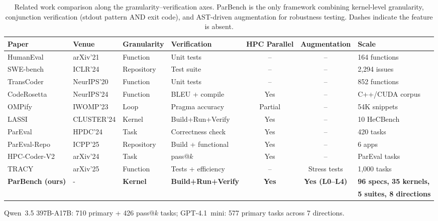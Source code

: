 \documentclass[conference]{IEEEtran}
\begin{document}
\begin{table}[t]
\centering
\caption{Related work comparison along the granularity--verification axes. ParBench is the only framework combining kernel-level granularity, conjunction verification (stdout pattern AND exit code), and AST-driven augmentation for robustness testing. Dashes indicate the feature is absent.}
\label{tab:related-work}
\small
\begin{tabular}{@{}llllccl@{}}
\toprule
Paper & Venue & Granularity & Verification & HPC Parallel & Augmentation & Scale \\
\midrule
HumanEval~\cite{HumanEval2021} & arXiv'21 & Function & Unit tests & -- & -- & 164 functions \\
SWE-bench~\cite{SWEbench2024} & ICLR'24 & Repository & Test suite & -- & -- & 2,294 issues \\
TransCoder~\cite{TransCoder2020} & NeurIPS'20 & Function & Unit tests & -- & -- & 852 functions \\
CodeRosetta~\cite{CodeRosetta2024} & NeurIPS'24 & Function & BLEU + compile & Yes & -- & C++/CUDA corpus \\
OMPify~\cite{OMPify2023} & IWOMP'23 & Loop & Pragma accuracy & Partial & -- & 54K snippets \\
LASSI~\cite{LASSI2024} & CLUSTER'24 & Kernel & Build+Run+Verify & Yes & -- & 10 HeCBench \\
ParEval~\cite{ParEval2024} & HPDC'24 & Task & Correctness check & Yes & -- & 420 tasks \\
ParEval-Repo~\cite{ParEvalRepo2025} & ICPP'25 & Repository & Build + functional & Yes & -- & 6 apps \\
HPC-Coder-V2~\cite{HPCCoderV2} & arXiv'24 & Task & pass@$k$ & Yes & -- & ParEval tasks \\
TRACY~\cite{TRACY2025} & arXiv'25 & Function & Tests + efficiency & -- & Stress tests & 1,000 tasks \\
\textbf{ParBench (ours)} & - & \textbf{Kernel} & \textbf{Build+Run+Verify} & \textbf{Yes} & \textbf{Yes (L0--L4)} & \textbf{96 specs, 35 kernels, } \\
& & & & & & \textbf{5 suites, 8 directions} \\
\bottomrule
\end{tabular}
\par\vspace{2pt}
{\footnotesize Qwen~3.5 397B-A17B: 710 primary + 426 pass@$k$ tasks; GPT-4.1~mini: 577 primary tasks across 7 directions.}
\end{table}
\end{document}
